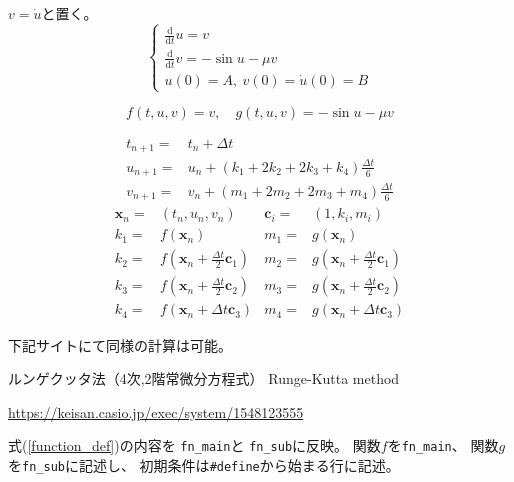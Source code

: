 \documentclass[12pt,b5paper]{ltjsarticle}
\begin{document}
$v=\dot{u}$と置く。
\begin{equation}
 \begin{cases}
  \frac{\mathrm{d}}{\mathrm{d}t}u=v\\
  \frac{\mathrm{d}}{\mathrm{d}t}v= -\sin u - \mu v\\
  u(0) = A,\ v(0)=\dot{u}(0) = B
 \end{cases}
\end{equation}

\begin{equation}
 f(t,u,v) = v
  ,\quad
 g(t,u,v) = -\sin u - \mu v
 \label{function_def}
\end{equation}

\begin{align}
 t_{n+1} =& t_{n}+\Delta t\\
 u_{n+1} =& u_{n}+(k_1+2k_2+2k_3+k_4)\frac{\Delta t}{6}\\
 v_{n+1} =& v_{n}+(m_1+2m_2+2m_3+m_4)\frac{\Delta t}{6}
\end{align}
\begin{align}
 \bm{x}_{n} =& (t_n,u_n,v_n)&
 \bm{c}_{i} =& (1,k_i,m_i)\\
 k_{1} =& f(\bm{x}_n) &
 m_{1} =& g(\bm{x}_n)\\
 k_{2} =& f\left(\bm{x}_n+\frac{\Delta t}{2}\bm{c}_1\right) &
 m_{2} =& g\left(\bm{x}_n+\frac{\Delta t}{2}\bm{c}_1\right)\\
 k_{3} =& f\left(\bm{x}_n+\frac{\Delta t}{2}\bm{c}_2\right) &
 m_{3} =& g\left(\bm{x}_n+\frac{\Delta t}{2}\bm{c}_2\right)\\
 k_{4} =& f\left(\bm{x}_n+\Delta t\bm{c}_3\right) &
 m_{4} =& g\left(\bm{x}_n+\Delta t\bm{c}_3\right)
\end{align}

\hrulefill

下記サイトにて同様の計算は可能。

ルンゲクッタ法（4次,2階常微分方程式）
Runge-Kutta method

\url{https://keisan.casio.jp/exec/system/1548123555}

\dotfill

式(\ref{function_def})の内容を
\texttt{fn\_main}と
\texttt{fn\_sub}に反映。
関数$f$を\texttt{fn\_main}、
関数$g$を\texttt{fn\_sub}に記述し、
初期条件は\texttt{\#define}から始まる行に記述。
\end{document}
